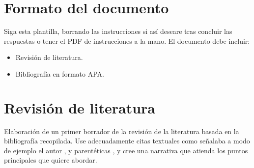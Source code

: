 \documentclass[11pt]{article}
\begin{document}
\section*{Formato del documento}
Siga esta plantilla, borrando las instrucciones si así deseare tras concluir las respuestas o tener el PDF de instrucciones a la mano. El documento debe incluir:
\begin{itemize}
    \item Revisión de literatura.
    \item Bibliografía en formato APA.
\end{itemize}
\onehalfspacing
\section*{Revisión de literatura}
Elaboración de un primer borrador de la revisión de la literatura basada en la bibliografía recopilada. Use adecuadamente citas textuales como señalaba a modo de ejemplo el autor \citet{hall2001introduction}, y parentéticas \citep[e.g]{hall2009institutional}, y cree una narrativa que atienda los puntos principales que quiere abordar.
\printbibliography[title={Bibliografía}, heading=subbibliography]
\end{document}
